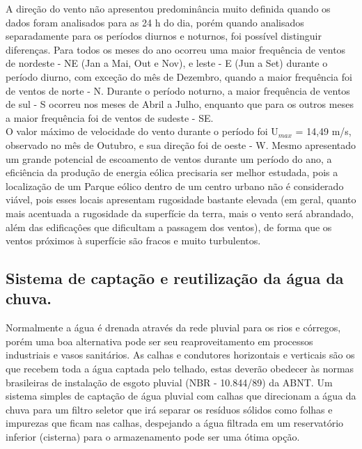 A dire\c{c}\~ao do vento n\~ao apresentou predomin\^ancia muito definida quando os dados foram analisados para as 24 h do dia, por\'em quando analisados separadamente para os per\'iodos diurnos e noturnos, foi poss\'ivel distinguir diferen\c{c}as. Para todos os meses do ano ocorreu uma maior frequ\^encia de ventos de nordeste - NE (Jan a Mai, Out e Nov), e leste - E (Jun a Set) durante o per\'iodo diurno, com exce\c{c}\~ao do m\^es de Dezembro, quando a maior frequ\^encia foi de ventos de norte - N. Durante o per\'iodo noturno, a maior frequ\^encia de ventos de sul - S ocorreu nos meses de Abril a Julho, enquanto que para os outros meses a maior frequ\^encia foi de ventos de sudeste - SE. \\

O valor m\'aximo de velocidade do vento durante o per\'iodo foi U$_{max}$ = 14,49 m/s, observado no m\^es de Outubro, e sua dire\c{c}\~ao foi de oeste - W. Mesmo apresentado um grande potencial de escoamento de ventos durante um per\'iodo do ano, a efici\^encia da produ\c{c}\~ao de energia e\'olica precisaria ser melhor estudada, pois a localiza\c{c}\~ao de um Parque e\'olico dentro de um centro urbano n\~ao \'e considerado vi\'avel, pois esses locais  apresentam rugosidade bastante elevada (em geral, quanto mais acentuada a rugosidade da superf\'icie da terra, mais o vento ser\'a abrandado, al\'em das edifica\c{c}\^oes que dificultam a passagem dos ventos), de forma que os ventos pr\'oximos \`a superf\'icie s\~ao fracos e muito turbulentos.

\subsection{Sistema de capta\c{c}\~ao e reutiliza\c{c}\~ao da \'agua da chuva.}

Normalmente a \'agua \'e drenada atrav\'es da rede pluvial para os rios e c\'orregos, por\'em uma boa alternativa pode ser seu reaproveitamento em processos industriais e vasos sanit\'arios. As calhas e condutores horizontais e verticais s\~ao os que recebem toda a \'agua captada pelo telhado, estas dever\~ao obedecer \`as normas brasileiras de instala\c{c}\~ao de esgoto pluvial (NBR - 10.844/89) da ABNT.
Um sistema simples de capta\c{c}\~ao de \'agua pluvial com calhas que direcionam a \'agua da chuva para um filtro seletor que ir\'a separar os res\'iduos s\'olidos como folhas e impurezas que ficam nas calhas, despejando a \'agua filtrada em um reservat\'orio inferior (cisterna) para o armazenamento pode ser uma \'otima op\c{c}\~ao.

